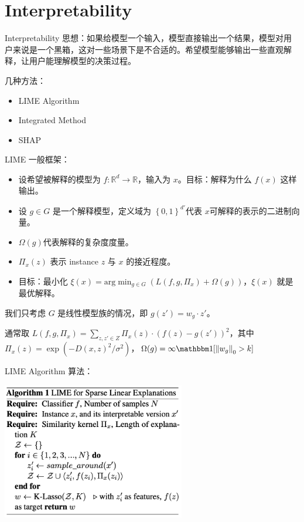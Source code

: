 \section{Interpretability}

\begin{frame}{Interpretability}
    思想：如果给模型一个输入，模型直接输出一个结果，模型对用户来说是一个黑箱，这对一些场景下是不合适的。希望模型能够输出一些直观解释，让用户能理解模型的决策过程。

    几种方法：
    \begin{itemize}
        \item LIME Algorithm
        \item Integrated Method
        \item SHAP
    \end{itemize}
\end{frame}

\begin{frame}{LIME}
    一般框架：
    \begin{itemize}
        \item 设希望被解释的模型为 $f: \mathbb{R}^{d}\to \mathbb{R}$，输入为 $x$。目标：解释为什么 $f(x)$ 这样输出。
        \item 设 $g \in G$ 是一个解释模型，定义域为 $\left\{ 0, 1 \right\}^{d'} $代表 $x$可解释的表示的二进制向量。
        \item $\Omega(g)$代表解释的复杂度度量。
        \item $\Pi_x(z)$ 表示 instance $z$ 与 $x$ 的接近程度。
        \item 目标：最小化 $\xi(x) = \text{arg}\min_{g \in G}\left( L(f, g, \Pi_x) + \Omega(g) \right) $，$\xi(x)$ 就是最优解释。
    \end{itemize}
    我们只考虑 $G$ 是线性模型族的情况，即 $g(z') = w_g \cdot z'$。
    
    通常取 $L(f, g, \Pi_x) = \sum_{z, z' \in Z} \Pi_x (z) \cdot (f(z) - g(z'))^{2}$，其中$\Pi_x(z) = \exp\left( - D(x, z)^{2} / \sigma^{2} \right) $，$\Omega(g) = \infty \mathbbm 1[\left\| w_g \right\| _0 > k]$

\end{frame}

\begin{frame}{LIME Algorithm}
    算法：
    \begin{center}
        \includegraphics[width=0.6\textwidth]{assets/lime.png}
    \end{center}
\end{frame}

